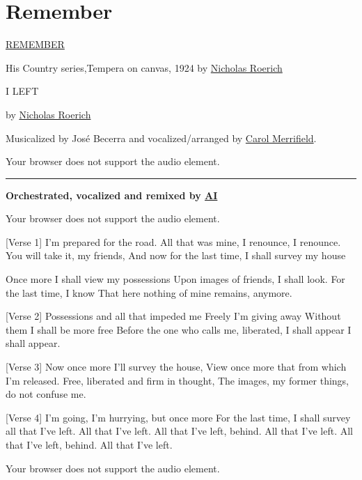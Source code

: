 \documentclass[
]{book}
\begin{document}
\hypertarget{remember}{%
\section*{Remember}\label{remember}}

\href{https://www.roerich.org/museum-paintings-catalogue.php}{REMEMBER}

His Country series,Tempera on canvas, 1924
by \href{https://www.roerich.org/museum-paintings-catalogue.php}{Nicholas Roerich}

I LEFT

by \href{https://www.roerich.org/roerich-writings-flame-in-chalice.php\#a27}{Nicholas Roerich}

Musicalized by José Becerra and vocalized/arranged by \href{https://open.spotify.com/playlist/37i9dQZF1E4xkOm8WMtIMe}{Carol Merrifield}.

Your browser does not support the audio element.

\begin{center}\rule{0.5\linewidth}{0.5pt}\end{center}

\textbf{Orchestrated, vocalized and remixed by \href{https://suno.com}{AI}}

Your browser does not support the audio element.

{[}Verse 1{]}
I'm prepared for the road.
All that was mine, I renounce, I renounce.
You will take it, my friends,
And now for the last time, I shall survey my house

Once more
I shall view my possessions
Upon images of friends, I shall look.
For the last time, I know
That here nothing of mine remains, anymore.

{[}Verse 2{]}
Possessions and all that impeded me
Freely I'm giving away
Without them I shall be more free
Before the one who calls me, liberated,
I shall appear I shall appear.

{[}Verse 3{]}
Now once more I'll survey the house,
View once more that from which I'm released.
Free, liberated and firm in thought,
The images, my former things, do not confuse me.

{[}Verse 4{]}
I'm going, I'm hurrying, but once more
For the last time,
I shall survey all that I've left.
All that I've left.
All that I've left, behind.
All that I've left.
All that I've left, behind.
All that I've left.

Your browser does not support the audio element.
\end{document}
